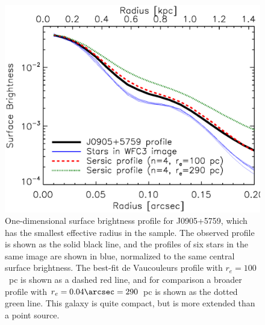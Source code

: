\documentclass[12pt,preprint]{aastex}
\begin{document}
\begin{figure}[!t]
\begin{center}
\includegraphics[angle=0,scale=0.7]{f2.ps}
\caption{One-dimensional surface brightness profile for J0905+5759,
  which has the smallest effective radius in the sample.  The observed
  profile is shown as the solid black line, and the profiles of six
  stars in the same image are shown in blue, normalized to the same
  central surface brightness.  The best-fit de Vaucouleurs profile
  with $r_e=100$~pc is shown as a dashed red line, and for comparison
  a broader profile with $r_e=0.04\arcsec=290$~pc is shown as the
  dotted green line.  This galaxy is quite compact, but is more
  extended than a point source.}
\label{fig:profile}
\end{center}
\end{figure}

\clearpage
\end{document}

